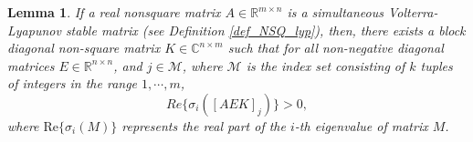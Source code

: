 \documentclass{article}
\newtheorem{lemma}{Lemma}
\begin{document}


\begin{lemma} \label{simul_lemma22a} 
If a real nonsquare matrix $A \in \mathbb{R}^{m \times n}$ is a simultaneous Volterra-Lyapunov stable matrix (see Definition \ref{def_NSQ_lyp}),
then, there exists a 
 block diagonal non-square matrix $K \in \mathbb{C}^{n \times m}$ such that for all non-negative diagonal matrices $E \in  \mathbb{R}^{n \times n}$, and $j \in \mathcal{M}$, where $\mathcal{M}$ is the index set consisting of $k$ tuples of integers in the
range $1,\cdots, m$,
\begin{equation}\label{suf_con_1}
Re\{ \sigma_i ( [A E K]_j ) \} >0,
\end{equation}
where $\text{Re} \{ \sigma_i (M) \}$ represents the real part of the $i$-th eigenvalue of matrix $M$.
\end{lemma}
\end{document}
